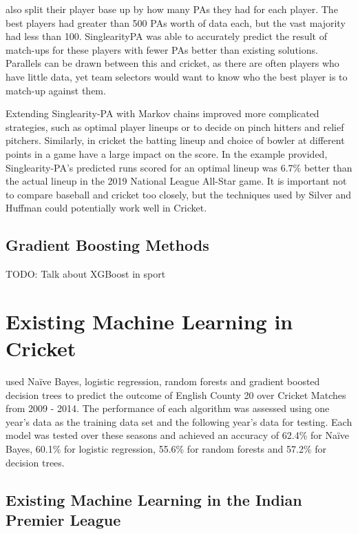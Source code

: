 \documentclass[12pt,a4paper]{report}
\begin{document}
\citet{silver2021baseball} also split their player base up by how many PAs they had for each player. The best players had greater than 500 PAs worth of data each, but the vast majority had less than 100. SinglearityPA was able to accurately predict the result of match-ups for these players with fewer PAs better than existing solutions. Parallels can be drawn between this and cricket, as there are often players who have little data, yet team selectors would want to know who the best player is to match-up against them.

Extending Singlearity-PA with Markov chains improved more complicated strategies, such as optimal player lineups or to decide on pinch hitters and relief pitchers. Similarly, in cricket the batting lineup and choice of bowler at different points in a game have a large impact on the score. In the example provided, Singlearity-PA's predicted runs scored for an optimal lineup was 6.7\% better than the actual lineup in the 2019 National League All-Star game. It is important not to compare baseball and cricket too closely, but the techniques used by Silver and Huffman could potentially work well in Cricket.

\subsection{Gradient Boosting Methods}

 TODO: Talk about XGBoost in sport

\section{Existing Machine Learning in Cricket}

\citet{KampakisStylianos2015} used Naïve Bayes, logistic regression, random forests and gradient boosted decision trees to predict the outcome of English County 20 over Cricket Matches from 2009 - 2014. The performance of each algorithm was assessed using one year's data as the training data set and the following year's data for testing. Each model was tested over these seasons and achieved an accuracy of 62.4\% for Naïve Bayes, 60.1\% for logistic regression, 55.6\% for random forests and 57.2\% for decision trees.

\subsection{Existing Machine Learning in the Indian Premier League}
\end{document}
